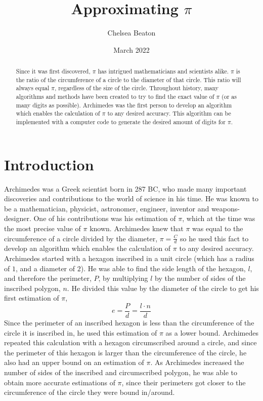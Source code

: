 \documentclass{article}
\title{Approximating $\pi$}
\author{Chelsea Beaton}
\date{March 2022}
\begin{document}
\maketitle

\begin{abstract}
    Since it was first discovered, $\pi$ has intrigued mathematicians and scientists alike. $\pi$ is the ratio of the circumference of a circle to the diameter of that circle. This ratio will always equal $\pi$, regardless of the size of the circle. Throughout history, many algorithms and methods have been created to try to find the exact value of $\pi$ (or as many digits as possible). Archimedes was the first person to develop an algorithm which enables the calculation of $\pi$ to any desired accuracy. This algorithm can be implemented with a computer code to generate the desired amount of digits for $\pi$. 
\end{abstract}

\section{Introduction}
Archimedes was a Greek scientist born in 287 BC, who made many important discoveries and contributions to the world of science in his time. He was known to be a mathematician, physicist, astronomer, engineer, inventor and weapons-designer. \cite{arch} One of his contributions was his estimation of $\pi$, which at the time was the most precise value of $\pi$ known. Archimedes knew that $\pi$ was equal to the circumference of a circle divided by the diameter, $\pi = \frac{C}{d}$ so he used this fact to develop an algorithm which enables the calculation of $\pi$ to any desired accuracy. Archimedes started with a hexagon inscribed in a unit circle (which has a radius of $1$, and a diameter of $2$). He was able to find the side length of the hexagon, $l$, and therefore the perimeter, $P$, by multiplying $l$ by the number of sides of the inscribed polygon, $n$. He divided this value by the diameter of the circle to get his first estimation of $\pi$,
\begin{equation} \label{eq:1}
    e = \frac{P}{d} = \frac{l \cdot n}{d}
\end{equation}
Since the perimeter of an inscribed hexagon is less than the circumference of the circle it is inscribed in, he used this estimation of $\pi$ as a lower bound. Archimedes repeated this calculation with a hexagon circumscribed around a circle, and since the perimeter of this hexagon is larger than the circumference of the circle, he also had an upper bound on an estimation of $\pi$. As Archimedes increased the number of sides of the inscribed and circumscribed polygon, he was able to obtain more accurate estimations of $\pi$, since their perimeters got closer to the circumference of the circle they were bound in/around.     
\end{document}
